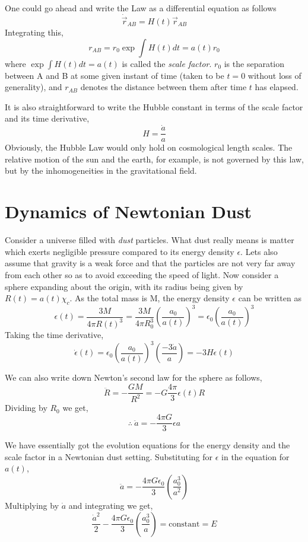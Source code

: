 \documentclass[a4paper,11pt]{report}
\begin{document}
One could go ahead and write the Law as a differential equation as follows
$$\dot{\vec{r}}_{AB}=H(t)\vec{r}_{AB}$$ Integrating this,
$$ r_{AB} = r_0 \exp\int H(t)dt = a(t)  r_0 $$
where $\exp\int H(t)dt = a(t)$ is called the \textit{scale factor}. $r_0$ is the separation between A and B at some given instant of time (taken to be $t=0$ without loss of generality), and $r_{AB}$ denotes the distance between them after time $t$ has elapsed.

It is also straightforward to write the Hubble constant in terms of the scale factor and its time derivative,
$$H =\frac{\dot{a}}{a}$$
Obviously, the Hubble Law would only hold on cosmological length scales. The relative motion of the sun and the earth, for example, is not governed by this law, but by the inhomogeneities in the gravitational field.

\section{Dynamics of Newtonian Dust}
Consider a universe filled with \textit{dust} particles. What dust really means is matter which exerts negligible pressure compared to its energy density $\epsilon$. Lets also assume that gravity is a weak force and that the particles are not very far away from each other so as to avoid exceeding the speed of light. Now consider a sphere expanding about the origin, with its radius being given by $R(t) = a(t) \chi_{c}$. As the total mass is M, the energy density $\epsilon$ can be written as
$$\epsilon(t)= \frac{3M}{4 \pi R(t)^3} = \frac{3M}{4 \pi R_0^3} \left(\frac{a_0}{a(t)}\right)^3 = \epsilon_0 \left(\frac{a_0}{a(t)}\right)^3  $$
Taking the time derivative,
$$\dot{\epsilon}(t) = \epsilon_0 \left(\frac{a_0}{a(t)}\right)^3 \left(\frac{-3\dot{a}}{a}\right) = -3H \epsilon(t)$$

We can also write down Newton's second law for the sphere as follows,
$$\ddot{R} = -\frac{GM}{R^2} = -G \frac{4 \pi }{3} \epsilon(t) R $$
Dividing by $R_0$ we get,
$$\therefore  \ \ddot{a} = -  \frac{4 \pi G}{3} \epsilon a$$

We have essentially got the evolution equations for the energy density and the scale factor in a Newtonian dust setting. Substituting for $\epsilon$ in the equation for $a(t)$,
$$\ddot{a} = -  \frac{4 \pi G \epsilon_0}{3}  \left(\frac{a_0^3}{a^2}\right) $$
Multiplying by $\dot{a}$ and integrating we get,
$$\frac{\dot{a}^2}{2} - \frac{4 \pi G \epsilon_0}{3}  \left(\frac{a_0^3}{a}\right) = \text{constant} = E  $$
\end{document}
